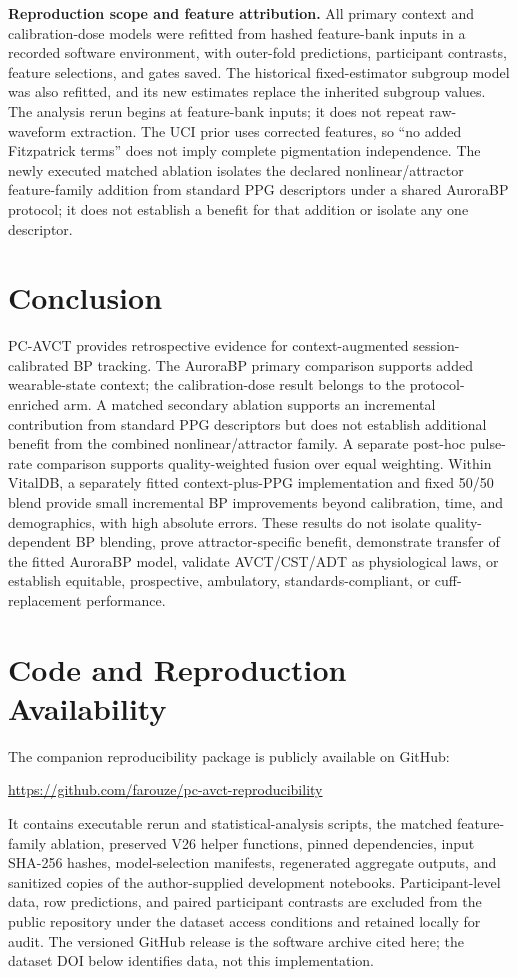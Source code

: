 \documentclass[journal]{IEEEtran}
\begin{document}
\textbf{Reproduction scope and feature attribution.} All primary context and calibration-dose models were refitted from hashed feature-bank inputs in a recorded software environment, with outer-fold predictions, participant contrasts, feature selections, and gates saved. The historical fixed-estimator subgroup model was also refitted, and its new estimates replace the inherited subgroup values. The analysis rerun begins at feature-bank inputs; it does not repeat raw-waveform extraction. The UCI prior uses corrected features, so ``no added Fitzpatrick terms'' does not imply complete pigmentation independence. The newly executed matched ablation isolates the declared nonlinear/attractor feature-family addition from standard PPG descriptors under a shared AuroraBP protocol; it does not establish a benefit for that addition or isolate any one descriptor.

\section{Conclusion}
\label{sec:conclusion}
PC-AVCT provides retrospective evidence for context-augmented session-calibrated BP tracking. The AuroraBP primary comparison supports added wearable-state context; the calibration-dose result belongs to the protocol-enriched arm. A matched secondary ablation supports an incremental contribution from standard PPG descriptors but does not establish additional benefit from the combined nonlinear/attractor family. A separate post-hoc pulse-rate comparison supports quality-weighted fusion over equal weighting. Within VitalDB, a separately fitted context-plus-PPG implementation and fixed 50/50 blend provide small incremental BP improvements beyond calibration, time, and demographics, with high absolute errors. These results do not isolate quality-dependent BP blending, prove attractor-specific benefit, demonstrate transfer of the fitted AuroraBP model, validate AVCT/CST/ADT as physiological laws, or establish equitable, prospective, ambulatory, standards-compliant, or cuff-replacement performance.
\section*{Code and Reproduction Availability}
The companion reproducibility package is publicly available on GitHub:
\begin{center}
\small\url{https://github.com/farouze/pc-avct-reproducibility}
\end{center}
It contains executable rerun and statistical-analysis scripts, the matched feature-family ablation, preserved V26 helper functions, pinned dependencies, input SHA-256 hashes, model-selection manifests, regenerated aggregate outputs, and sanitized copies of the author-supplied development notebooks. Participant-level data, row predictions, and paired participant contrasts are excluded from the public repository under the dataset access conditions and retained locally for audit. The versioned GitHub release is the software archive cited here; the dataset DOI below identifies data, not this implementation.
\end{document}
